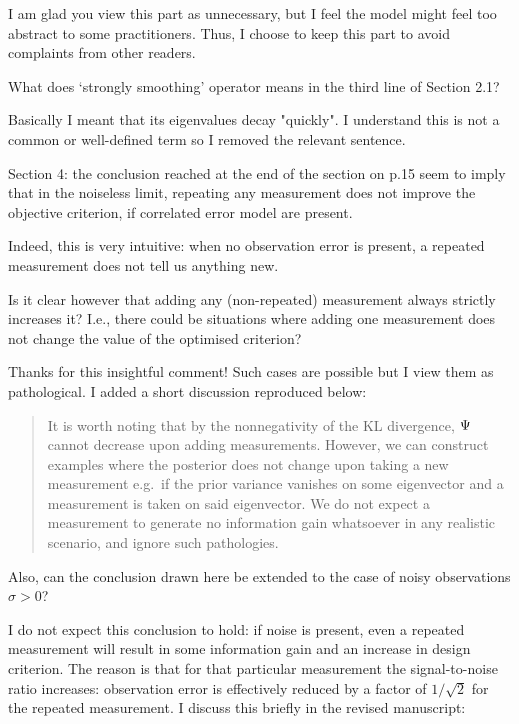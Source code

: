 \AR I am glad you view this part as unnecessary, but I feel the model
might feel too abstract to some practitioners. Thus, I choose to keep
this part to avoid complaints from other readers.

\RC What does ‘strongly smoothing’ operator means in the third line of Section 2.1?

\AR Basically I meant that its eigenvalues decay "quickly". I
understand this is not a common or well-defined term so I removed the
relevant sentence.

  
\RC Section 4: the conclusion reached at the end of the section on
p.15 seem to imply that in the noiseless limit, repeating any
measurement does not improve the objective criterion, if correlated
error model are present.

\AR Indeed, this is very intuitive: when no observation error is
present, a repeated measurement does not tell us anything new.


\RC Is it clear however that adding any (non-repeated) measurement
always strictly increases it? I.e., there could be situations where
adding one measurement does not change the value of the optimised
criterion?

\AR Thanks for this insightful comment! Such cases are possible but I
view them as pathological. I added a short discussion reproduced
below:

\begin{quote}
  It is worth noting that by the nonnegativity of the KL divergence,
  $\Psi$ cannot decrease upon adding measurements. However, we can
  construct examples where the posterior does not change upon taking a
  new measurement e.g.~if the prior variance vanishes on some
  eigenvector and a measurement is taken on said eigenvector. We do
  not expect a measurement to generate no information gain whatsoever
  in any realistic scenario, and ignore such pathologies.
\end{quote}

\RC Also, can the conclusion drawn here be extended to the case of
noisy observations $\sigma > 0$?

\AR I do not expect this conclusion to hold: if noise is present, even
a repeated measurement will result in some information gain and an
increase in design criterion. The reason is that for that particular
measurement the signal-to-noise ratio increases: observation error is
effectively reduced by a factor of $1/\sqrt{2}$ for the repeated
measurement. I discuss this briefly in the revised manuscript:

